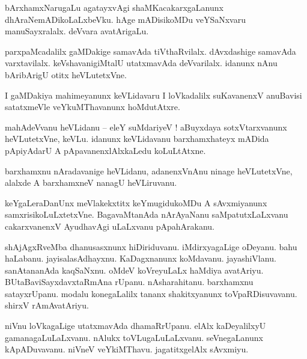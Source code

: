 \documentclass{article}
\begin{document}
\begin{mn}%
bArxhamxNarugaLu agatayxvAgi shaMKacakarxgaLanunx dhAraNemADikoLaLxbeVku. hAge mADisikoMDu 
veYSaNxvaru manuSayxralalx. deVvara avatArigaLu.
\end{mn}

\begin{mn}%
parxpaMcadalilx gaMDakige samavAda tiVthaRvilalx. dAvxdashige samavAda varxtavilalx. 
keVshavanigiMtalU utatxmavAda deVvarilalx. idanunx nAnu bAribArigU otitx heVLutetxVne.
\end{mn}

\begin{mn}%
I gaMDakiya mahimeyanunx keVLidavaru I loVkadalilx suKavanenxV anuBavisi satatxmeVle 
veYkuMThavanunx hoMdutAtxre.
\end{mn}


\begin{mn}%
mahAdeVvanu heVLidanu -- eleY suMdariyeV ! aBuyxdaya sotxVtarxvanunx heVLutetxVne, keVLu. idanunx 
keVLidavanu barxhamxhateyx mADida pApiyAdarU A pApavanenxlAlxkaLedu koLuLtAtxne.
\end{mn}

\begin{mn}%
barxhamxnu nAradavanige heVLidanu, adanenxVnAnu ninage heVLutetxVne, alalxde A barxhamxneV nanagU 
heVLiruvanu.
\end{mn}

\begin{mn}%
keYgaLeraDanUnx meVlakekxtitx keYmugidukoMDu A sAvxmiyanunx samxrisikoLuLxtetxVne. BagavaMtanAda 
nArAyaNanu saMpatutxLaLxvanu cakarxvanenxV AyudhavAgi uLaLxvanu pApahArakanu.
\end{mn}

\begin{mn}%
shAjAgxRveMba dhanusasxnunx hiDiriduvanu. iMdirxyagaLige oDeyanu. bahu haLabanu. jayisalasAdhayxnu. 
KaDagxnanunx koMdavanu. jayashiVlanu. sanAtananAda kaqSaNxnu. oMdeV koVreyuLaLx haMdiya avatAriyu. 
BUtaBaviSayxdavxtaRmAna rUpanu. nAsharahitanu. barxhamxnu satayxrUpanu. modalu konegaLalilx tananx 
shakitxyanunx toVpaRDisuvavanu. shirxV rAmAvatAriyu.
\end{mn}

\begin{mn}%
niVnu loVkagaLige utatxmavAda dhamaRrUpanu. elAlx kaDeyalilxyU gamanagaLuLaLxvanu. nAlukx 
toVLugaLuLaLxvanu. seVnegaLanunx kApADuvavanu. niVneV veYkiMThavu. jagatitxgelAlx sAvxmiyu.
\end{mn}
\end{document}
